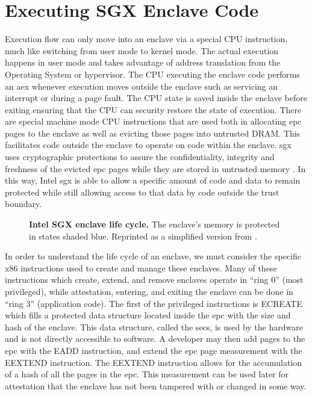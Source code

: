 \section{Executing SGX Enclave Code}
Execution flow can only move into an enclave via a special CPU instruction, much like switching from user mode to kernel mode. The actual execution happens in user mode and takes advantage of address translation from the Operating System or hypervisor. The CPU executing the enclave code performs an \gls{aex} whenever execution moves outside the enclave such as servicing an interrupt or during a page fault. The CPU state is saved inside the enclave before exiting ensuring that the CPU can security restore the state of execution. There are special machine mode CPU instructions that are used both in allocating \gls{epc} pages to the enclave as well as evicting those pages into untrusted DRAM. This facilitates code outside the enclave to operate on code within the enclave. \gls{sgx} uses cryptographic protections to assure the confidentiality, integrity and freshness of the evicted \gls{epc} pages while they are stored in untrusted memory \cite{intel-sgx-explained}. In this way, Intel \gls{sgx} is able to allow a specific amount of code and data to remain protected while still allowing access to that data by code outside the trust boundary.

\begin{figure}[ht]
\makebox[\textwidth][c]{
}\caption[Intel SGX Enclave Lifecycle]{\textbf{Intel SGX enclave life cycle.} The enclave's memory is protected in states shaded blue. Reprinted as a simplified version from \cite{intel-sgx-explained}.\label{figure:sgx-enclave-life-cycle}}
\end{figure}

In order to understand the life cycle of an enclave, we must consider the specific x86 instructions used to create and manage these enclaves. Many of these instructions which create, extend, and remove enclaves operate in ``ring 0'' (most privileged), while attestation, entering, and exiting the enclave can be done in ``ring 3'' (application code). The first of the privileged instructions is ECREATE which fills a protected data structure located inside the \gls{epc} with the size and hash of the enclave. This data structure, called the \gls{secs}, is used by the hardware and is not directly accessible to software. A developer may then add pages to the \gls{epc} with the EADD instruction, and extend the \gls{epc} page measurement with the EEXTEND instruction. The EEXTEND instruction allows for the accumulation of a hash of all the pages in the \gls{epc}. This measurement can be used later for attestation that the enclave has not been tampered with or changed in some way.

